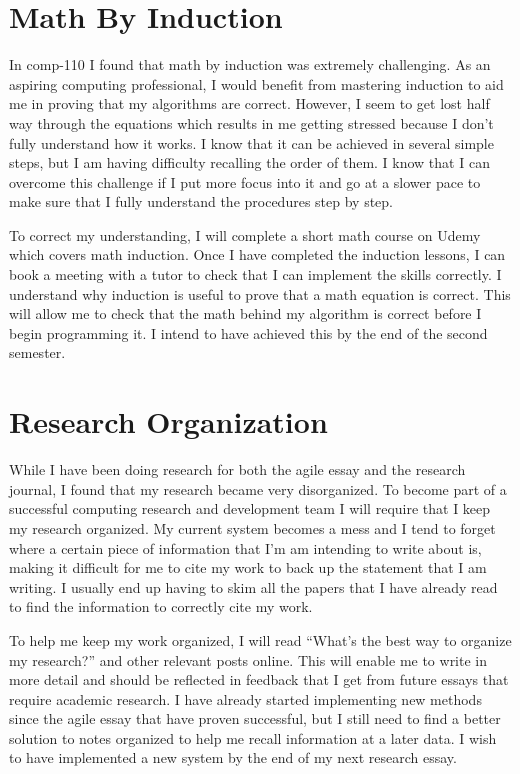 \documentclass{scrartcl}
\begin{document}
\section{Math By Induction}

In comp-110 I found that math by induction was extremely challenging. As an aspiring computing professional, I would benefit from mastering induction to aid me in proving that my algorithms are correct. However, I seem to get lost half way through the equations which results in me getting stressed because I don’t fully understand how it works. I know that it can be achieved in several simple steps, but I am having difficulty recalling the order of them. I know that I can overcome this challenge if I put more focus into it and go at a slower pace to make sure that I fully understand the procedures step by step.

To correct my understanding, I will complete a short math course on Udemy \cite{Udemy} which covers math induction. Once I have completed the induction lessons, I can book a meeting with a tutor to check that I can implement the skills correctly. I understand why induction is useful to prove that a math equation is correct. This will allow me to check that the math behind my algorithm is correct before I begin programming it. I intend to have achieved this by the end of the second semester. 

\section{Research Organization}

While I have been doing research for both the agile essay and the research journal, I found that my research became very disorganized. To become part of a successful computing research and development team I will require that I keep my research organized. My current system becomes a mess and I tend to forget where a certain piece of information that I’m am intending to write about is, making it difficult for me to cite my work to back up the statement that I am writing. I usually end up having to skim all the papers that I have already read to find the information to correctly cite my work.

To help me keep my work organized, I will read “What’s the best way to organize my research?” \cite{research} and other relevant posts online. This will enable me to write in more detail and should be reflected in feedback that I get from future essays that require academic research. I have already started implementing new methods since the agile essay that have proven successful, but I still need to find a better solution to notes organized to help me recall information at a later data. I wish to have implemented a new system by the end of my next research essay.
\end{document}

